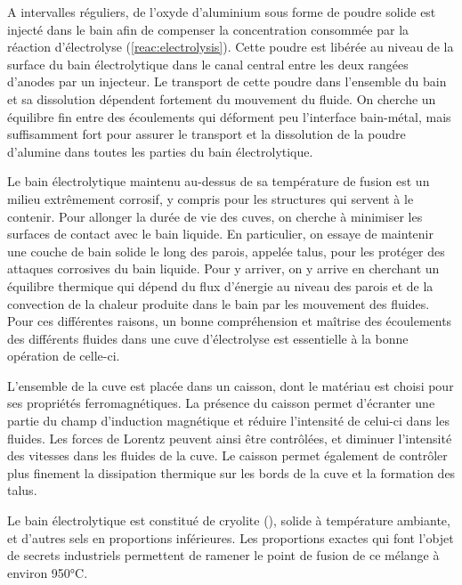 A intervalles réguliers, de l'oxyde d'aluminium sous forme de poudre
solide est injecté dans le bain afin de compenser la concentration
consommée par la réaction d'électrolyse (\ref{reac:electrolysis}).
Cette poudre est libérée au niveau de la surface du bain
électrolytique dans le canal central entre les deux rangées d'anodes
par un injecteur. Le transport de cette poudre dans l'ensemble du bain
et sa dissolution dépendent fortement du mouvement du fluide. On
cherche un équilibre fin entre des écoulements qui déforment peu
l'interface bain-métal, mais suffisamment fort pour assurer le
transport et la dissolution de la poudre d'alumine dans toutes les
parties du bain électrolytique.

Le bain électrolytique maintenu au-dessus de sa température de fusion
est un milieu extrêmement corrosif, y compris pour les structures qui
servent à le contenir. Pour allonger la durée de vie des cuves, on
cherche à minimiser les surfaces de contact avec le bain liquide. En
particulier, on essaye de maintenir une couche de bain solide le long
des parois, appelée talus, pour les protéger des attaques corrosives du
bain liquide. Pour y arriver, on y arrive en cherchant un équilibre
thermique qui dépend du flux d'énergie au niveau des parois et de la
convection de la chaleur produite dans le bain par les mouvement des
fluides. Pour ces différentes raisons, un bonne compréhension et
maîtrise des écoulements des différents fluides dans une cuve
d'électrolyse est essentielle à la bonne opération de celle-ci.


L'ensemble de la cuve est placée dans un caisson, dont le matériau est
choisi pour ses propriétés ferromagnétiques. La présence du caisson
permet d'écranter une partie du champ d'induction magnétique et
réduire l'intensité de celui-ci dans les fluides. Les forces de
Lorentz peuvent ainsi être contrôlées, et diminuer l'intensité des
vitesses dans les fluides de la cuve. Le caisson permet également de
contrôler plus finement la dissipation thermique sur les bords de la
cuve et la formation des talus.



Le bain électrolytique est constitué de cryolite (),
solide à température ambiante, et d'autres sels en proportions
inférieures. Les proportions exactes qui font l'objet de secrets
industriels permettent de ramener le point de fusion de ce mélange à
environ \num{950}\si{\celsius}.

